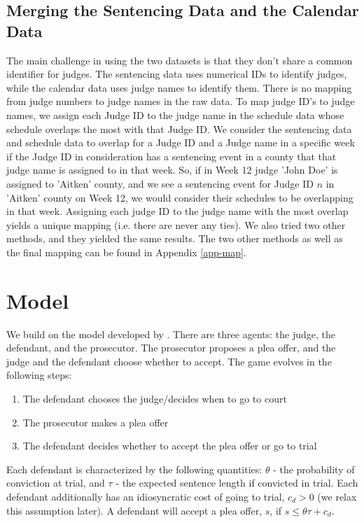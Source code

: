 \documentclass[11pt]{article}
\theoremstyle{ModifiedStyle}
\begin{document}
  \subsection{Merging the Sentencing Data and the Calendar Data}
	  \label{mapping-judge-names}
    The main challenge in using the two datasets is that they don't share a common identifier for judges. The sentencing data uses numerical IDs to
    identify judges, while the calendar data uses judge names to identify them. There is no mapping from judge numbers to judge names in the raw data. To map judge ID's to judge names, we assign each Judge ID to the judge name in the schedule data whose schedule overlaps the most with that Judge ID. We consider the sentencing data and schedule data to overlap for a Judge ID and a Judge name in a specific week if the Judge ID in consideration has a sentencing event in a county that that judge name is assigned to in that week. So, if in Week 12 judge 'John Doe' is assigned to 'Aitken' county, and we see a sentencing event for Judge ID $n$ in 'Aitken' county on Week 12, we would consider their schedules to be overlapping in that week. Assigning each judge ID to the judge name with the most overlap yields a unique mapping (i.e. there are never any ties). We also tried two other methods, and they yielded the same results. The two other methods as well as the final mapping can be found in Appendix \ref{app-map}.

\section{Model}
  We build on the model developed by \cite{wang2019}. There are three agents: the judge, the defendant, and the prosecutor. The prosecutor proposes a plea offer, and the judge and the defendant choose whether to accept. The game evolves in the following steps:

  \begin{enumerate}
    \item The defendant chooses the judge/decides when to go to court
    \item The prosecutor makes a plea offer
    \item The defendant decides whether to accept the plea offer or go to trial
  \end{enumerate}

  Each defendant is characterized by the following quantities: $\theta$ - the probability of conviction at trial, and $\tau$ - the expected sentence length if convicted in trial. Each defendant additionally has an idiosyncratic cost of going to trial, $c_d >0$ (we relax this assumption later). A defendant will accept a plea offer, $s$, if $s \leq \theta \tau + c_d$.\\
\end{document}
